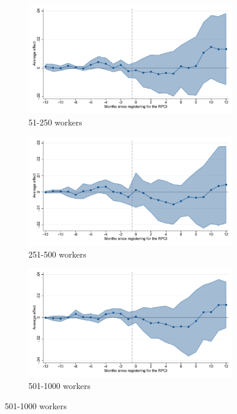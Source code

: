 \clearpage

\begin{figure}[H]
    \centering
    \ContinuedFloat
    \caption{(Cont.) Event studies - RPCI effect on enrollment}

    \begin{subfigure}{0.32\textwidth}
    \caption{51-250 workers}
    \includegraphics[width=\textwidth]{04_Figures/muestra_10porciento/event_study_alta_size_51_dcdh_connected.pdf}
    \end{subfigure}
    \begin{subfigure}{0.32\textwidth}
    \caption{251-500 workers}
    \includegraphics[width=\textwidth]{04_Figures/muestra_10porciento/event_study_alta_size_251_dcdh_connected.pdf}
    \end{subfigure}
    \begin{subfigure}{0.32\textwidth}
    \caption{501-1000 workers}
    \includegraphics[width=\textwidth]{04_Figures/muestra_10porciento/event_study_alta_size_501_dcdh_connected.pdf}
    \end{subfigure}
    

\end{figure}
